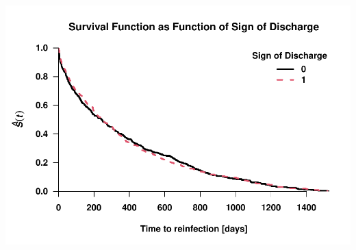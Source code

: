 \documentclass[
]{article}
\begin{document}
\includegraphics{practical_files/figure-latex/unnamed-chunk-9-1.pdf}
\end{document}
